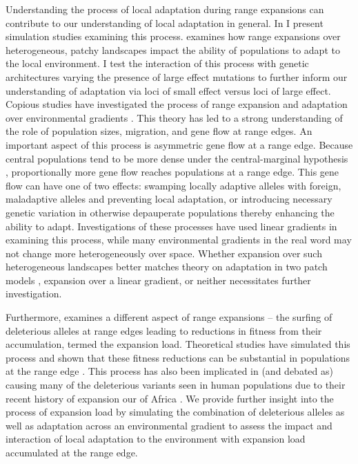 Understanding the process of local adaptation during range expansions can contribute to our understanding of local adaptation in general. In  I present simulation studies examining this process.  examines how range expansions over heterogeneous, patchy landscapes impact the ability of populations to adapt to the local environment. I test the interaction of this process with genetic architectures varying the presence of large effect mutations to further inform our understanding of adaptation via loci of small effect versus loci of large effect. Copious studies have investigated the process of range expansion and adaptation over environmental gradients \citep{Kirkpatrick:1997, Barton:2001, Bridle:2010, Polechova:2015, GarciaRamos:1997}. This theory has led to a strong understanding of the role of population sizes, migration, and gene flow at range edges. An important aspect of this process is asymmetric gene flow at a range edge. Because central populations tend to be more dense under the central-marginal hypothesis \citep{Brown:1984, Eckert:2008}, proportionally more gene flow reaches populations at a range edge. This gene flow can have one of two effects: swamping locally adaptive alleles with foreign, maladaptive alleles and preventing local adaptation, or introducing necessary genetic variation in otherwise depauperate populations thereby enhancing the ability to adapt. Investigations of these processes have used linear gradients in examining this process, while many environmental gradients in the real word may not change more heterogeneously over space. Whether expansion over such heterogeneous landscapes better matches theory on adaptation in two patch models \citep{Gomulkiewicz:1995, Ronce:2001, Holt:1997, Gomulkiewicz:1999}, expansion over a linear gradient, or neither necessitates further investigation.

Furthermore,  examines a different aspect of range expansions -- the surfing of deleterious alleles at range edges leading to reductions in fitness from their accumulation, termed the expansion load. Theoretical studies have simulated this process and shown that these fitness reductions can be substantial in populations at the range edge \citep{Peischl:2013, Peischl:2015, Peischl:2015b}. This process has also been implicated in (and debated as) causing many of the deleterious variants seen in human populations due to their recent history of expansion our of Africa \citep{Henn:2015, Henn:2015b, Lohmueller:2008, Lohmueller:2014b, Do:2015}. We provide further insight into the process of expansion load by simulating the combination of deleterious alleles as well as adaptation across an environmental gradient to assess the impact and interaction of local adaptation to the environment with expansion load accumulated at the range edge.


